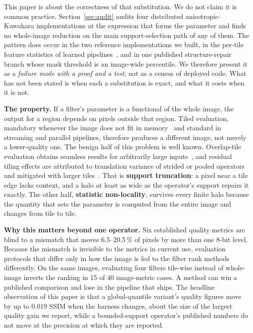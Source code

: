 \documentclass[journal]{IEEEtran}
\begin{document}
This paper is about the correctness of that substitution. We do not claim it is common practice. Section~\ref{sec:audit} audits four distributed anisotropic-Kuwahara implementations at the expression that forms the parameter and finds no whole-image reduction on the main support-selection path of any of them. The pattern does occur in the two reference implementations we built, in the per-tile feature statistics of learned pipelines~\cite{buglakova2025tiling}, and in one published structure-repair branch whose mask threshold is an image-wide percentile. We therefore present it as a \emph{failure mode with a proof and a test}, not as a census of deployed code. What has not been stated is when such a substitution is exact, and what it costs when it is not.

\textbf{The property.} If a filter's parameter is a functional of the whole image, the output for a region depends on pixels outside that region. Tiled evaluation, mandatory whenever the image does not fit in memory~\cite{dash2022gigapixel,powell2010gigapixel} and standard in streaming and parallel pipelines, therefore produces a different image, not merely a lower-quality one. The benign half of this problem is well known. Overlap-tile evaluation obtains seamless results for arbitrarily large inputs~\cite{ronneberger2015unet}, and residual tiling effects are attributed to translation variance of strided or pooled operators and mitigated with larger tiles~\cite{reina2020tiling,huang2018tiling}. That is \textbf{support truncation}: a pixel near a tile edge lacks context, and a halo at least as wide as the operator's support repairs it exactly. The other half, \textbf{statistic non-locality}, survives every finite halo because the quantity that sets the parameter is computed from the entire image and changes from tile to tile.

\textbf{Why this matters beyond one operator.} Six established quality metrics are blind to a mismatch that moves 6.5--20.5\,\% of pixels by more than one 8-bit level. Because the mismatch is invisible to the metrics in current use, evaluation protocols that differ only in how the image is fed to the filter rank methods differently. On the same images, evaluating four filters tile-wise instead of whole-image inverts the ranking in 15 of 40 image-metric cases. A method can win a published comparison and lose in the pipeline that ships. The headline observation of this paper is that a global-quantile variant's quality figures move by up to \(0.019\) SSIM when the harness changes, about the size of the largest quality gain we report, while a bounded-support operator's published numbers do not move at the precision at which they are reported.
\end{document}
